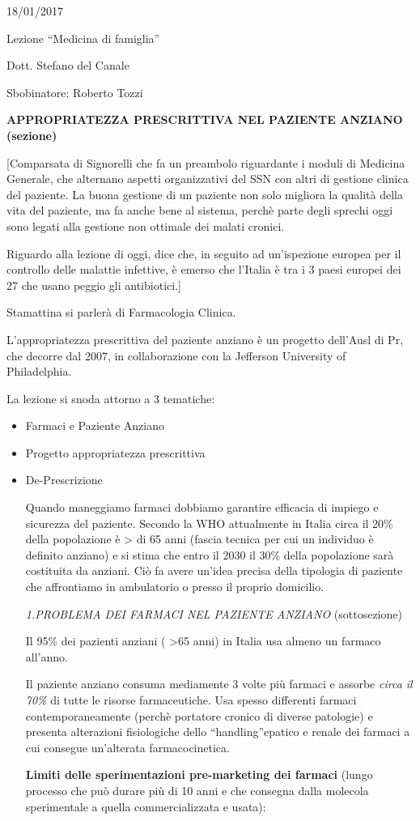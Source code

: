 \documentclass[]{article}
\date{}
\begin{document}
18/01/2017

Lezione ``Medicina di famiglia''

Dott. Stefano del Canale

Sbobinatore: Roberto Tozzi

\textbf{APPROPRIATEZZA PRESCRITTIVA NEL PAZIENTE ANZIANO (sezione)}

{[}Comparsata di Signorelli che fa un preambolo riguardante i moduli di
Medicina Generale, che alternano aspetti organizzativi del SSN con altri
di gestione clinica del paziente. La buona gestione di un paziente non
solo migliora la qualità della vita del paziente, ma fa anche bene al
sistema, perchè parte degli sprechi oggi sono legati alla gestione non
ottimale dei malati cronici.

Riguardo alla lezione di oggi, dice che, in seguito ad un'ispezione
europea per il controllo delle malattie infettive, è emerso che l'Italia
è tra i 3 paesi europei dei 27 che usano peggio gli antibiotici.{]}

Stamattina si parlerà di Farmacologia Clinica.

L'appropriatezza prescrittiva del paziente anziano è un progetto
dell'Ausl di Pr, che decorre dal 2007, in collaborazione con la
Jefferson University of Philadelphia.

La lezione si snoda attorno a 3 tematiche:

\begin{itemize}
\item
  Farmaci e Paziente Anziano
\item
  Progetto appropriatezza prescrittiva
\item
  De-Prescrizione

  Quando maneggiamo farmaci dobbiamo garantire efficacia di impiego e
  sicurezza del paziente. Secondo la WHO attualmente in Italia circa il
  20\% della popolazione è \textgreater{} di 65 anni (fascia tecnica per
  cui un individuo è definito anziano) e si stima che entro il 2030 il
  30\% della popolazione sarà costituita da anziani. Ciò fa avere
  un'idea precisa della tipologia di paziente che affrontiamo in
  ambulatorio o presso il proprio domicilio.

  \emph{1.PROBLEMA DEI FARMACI NEL PAZIENTE ANZIANO} (sottosezione)

  Il 95\% dei pazienti anziani ( \textgreater{}65 anni) in Italia usa
  almeno un farmaco all'anno.

  Il paziente anziano consuma mediamente 3 volte più farmaci e assorbe
  \emph{circa il 70\%} di tutte le risorse farmaceutiche. Usa spesso
  differenti farmaci contemporaneamente (perchè portatore cronico di
  diverse patologie) e presenta alterazioni fisiologiche dello
  ``handling''epatico e renale dei farmaci a cui consegue un'alterata
  farmacocinetica.

  \textbf{Limiti delle sperimentazioni pre-marketing dei farmaci} (lungo
  processo che può durare più di 10 anni e che consegna dalla molecola
  sperimentale a quella commercializzata e usata):
\end{itemize}
\end{document}

